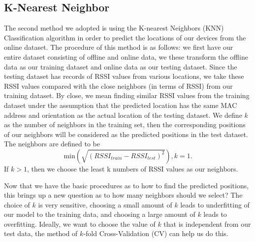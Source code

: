 \documentclass[12pt, conference]{IEEEtran}
\begin{document}
\subsection{K-Nearest Neighbor}
The second method we adopted is using the K-nearest Neighbors (KNN) Classification algorithm in order to predict the locations of our devices from the online dataset. The procedure of this method is as follows: we first have our entire dataset consisting of offline and online data, we these transform the offline data as our training dataset and online data as our testing dataset. Since the testing dataset has records of RSSI values from various locations, we take these RSSI values compared with the close neighbors (in terms of RSSI) from our training dataset. By close, we mean finding similar RSSI values from the training dataset under the assumption that the predicted location has the same MAC address and orientation as the actual location of the testing dataset. We define $k$ as the number of neighbors in the training set, then the corresponding positions of our neighbors will be considered as the predicted positions in the test dataset. The neighbors are defined to be 
$$
  \text{min}\left(\sqrt{(RSSI_{train}-RSSI_{test})^2}\right), k=1.
$$ 
If $k>1$, then we choose the least k numbers of RSSI values as our neighbors.


Now that we have the basic procedures as to how to find the predicted positions, this brings up a new question as to how many neighbors should we select? The choice of $k$ is very sensitive, choosing a small amount of $k$ leads to underfitting of our model to the training data, and choosing a large amount of $k$ leads to overfitting. Ideally, we want to choose the value of $k$ that is independent from our test data, the method of $k$-fold Cross-Validation (CV) can help us do this.
\end{document}
